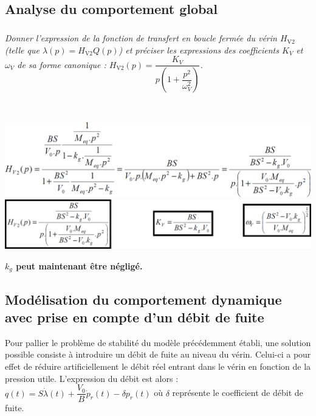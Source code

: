 \begin{multicols}{2}
\begin{multicols}{2}
\subsection*{Analyse du comportement global}


\subparagraph{}\textit{Donner l'expression de la fonction de transfert en boucle fermée du vérin $H_{\text{V2}}$ (telle que $\lambda(p) =  H_{\text{V2}} Q(p)$) et préciser les expressions des coefficients $K_V$ et $\omega_V$ de sa forme canonique : $H_{\text{V2}}(p)=\dfrac{K_V}{p\left( 1+\dfrac{p^2}{\omega_V^2}\right)}$.}
\ifprof
\begin{corrige} ~\\
\begin{center}
\includegraphics[width=.95\linewidth]{images/cor_05}
\includegraphics[width=.95\linewidth]{images/cor_06}
\end{center}
\end{corrige}
\else
\fi

\textbf{$k_g$ peut maintenant être négligé.}

\subsection*{Modélisation du comportement dynamique avec prise en compte d'un débit de fuite}
Pour pallier le problème de stabilité du modèle précédemment établi, une solution possible consiste à introduire un débit de fuite au niveau du vérin. Celui-ci a pour effet de réduire artificiellement le débit réel entrant dans le vérin en fonction de la pression utile. L'expression du débit est alors : 
$q(t)=S\dot{\lambda}(t)+\dfrac{V_0}{B} \dot{p}_r(t)-\delta p_r(t)$ où $\delta$ représente le coefficient de débit de fuite.



\end{multicols}
\end{multicols}
